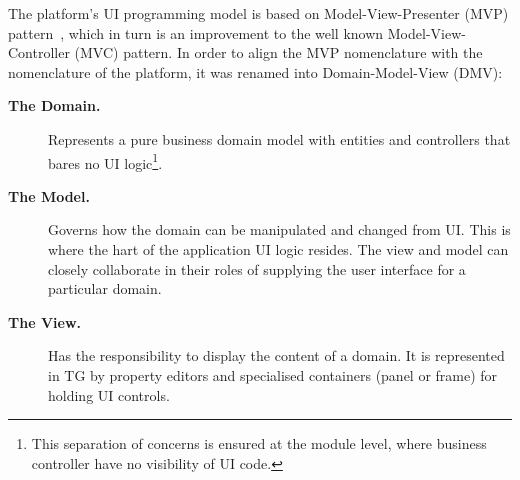   The platform's UI programming model is based on Model-View-Presenter (MVP) pattern~\cite{BoGl2000}, which in turn is an improvement to the well known Model-View-Controller (MVC) pattern.  
  In order to align the MVP nomenclature with the nomenclature of the platform, it was renamed into Domain-Model-View (DMV):
  \begin{description}
    \item[\textbf{The Domain.}] Represents a pure business domain model with entities and controllers that bares no UI logic\footnote{This separation of concerns is ensured at the module level, where business controller have no visibility of UI code.}.
    \item [\textbf{The Model.}] Governs how the domain can be manipulated and changed from UI. 
	This is where the hart of the application UI logic resides. The view and model can closely collaborate in their roles of supplying the user interface for a particular domain.
    \item[\textbf{The View.}] Has the responsibility to display the content of a domain. 
	It is represented in TG by property editors and specialised containers (panel or frame) for holding UI controls.    
  \end{description}

